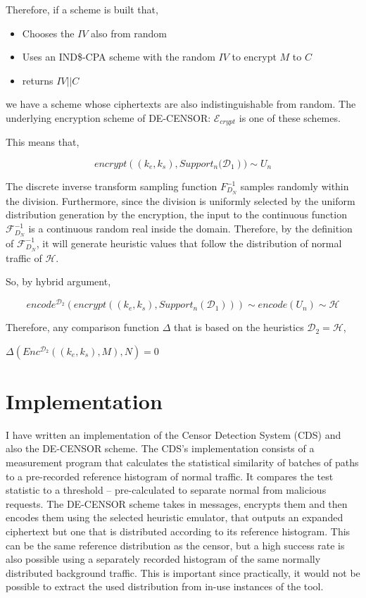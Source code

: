 \documentclass[ %
                    author={Samuel Russell},
                supervisor={Prof. Bogdan Warinschi},
                    degree={MEng},
                     title={Innocuous Ciphertexts},
                  subtitle={The DE-CENSOR Scheme},
                      type={Research},
                      year={2018} ]{dissertation}
\begin{document}
Therefore, if a scheme is built that,
\begin{itemize}
\item Chooses the $IV$ also from random
\item Uses an IND\$-CPA scheme with the random $IV$ to encrypt $M$ to $C$
\item returns $IV || C$
\end{itemize}

we have a scheme whose ciphertexts are also indistinguishable from random.
The underlying encryption scheme of DE-CENSOR: $\mathcal{E}_{crypt}$ is one of these schemes.

This means that,

$$ encrypt \left( (k_e, k_s), Support_n(\mathcal{D}_1 \right) ) \sim  U_n$$

The discrete inverse transform sampling function $F^{-1}_{D_N}$ samples randomly within the division.
Furthermore, since the division is uniformly selected by the uniform distribution generation by the encryption, the input to the continuous function $\mathcal{F}^{-1}_{D_N}$ is a continuous random real inside the domain.
Therefore, by the definition of $\mathcal{F}^{-1}_{D_N}$, it will generate heuristic values that follow the distribution of normal traffic of $\mathcal{H}$.

So, by hybrid argument,

$$ encode^{\mathcal{D}_2} \left( encrypt \left( (k_e, k_s), Support_n(\mathcal{D}_1) \right) \right) \sim  encode \left( U_n \right) \sim \mathcal{H}$$

Therefore, any comparison function $\Delta$ that is based on the heuristics $\mathcal{D}_2 = \mathcal{H}$,

$\Delta \left(  Enc^{\mathcal{D}_2}((k_e,k_s), M), N  \right) = 0$

\chapter{Implementation}

I have written an implementation of the Censor Detection System (CDS) and also the DE-CENSOR scheme.
The CDS's implementation consists of a measurement program that calculates the statistical similarity of batches of paths to a pre-recorded reference histogram of normal traffic.
It compares the test statistic to a threshold -- pre-calculated to separate normal from malicious requests.
The DE-CENSOR scheme takes in messages, encrypts them and then encodes them using the selected heuristic emulator, that outputs an expanded ciphertext but one that is distributed according to its reference histogram. This can be the same reference distribution as the censor, but a high success rate is also possible using a separately recorded histogram of the same normally distributed background traffic.
This is important since practically, it would not be possible to extract the used distribution from in-use instances of the tool.
\end{document}
